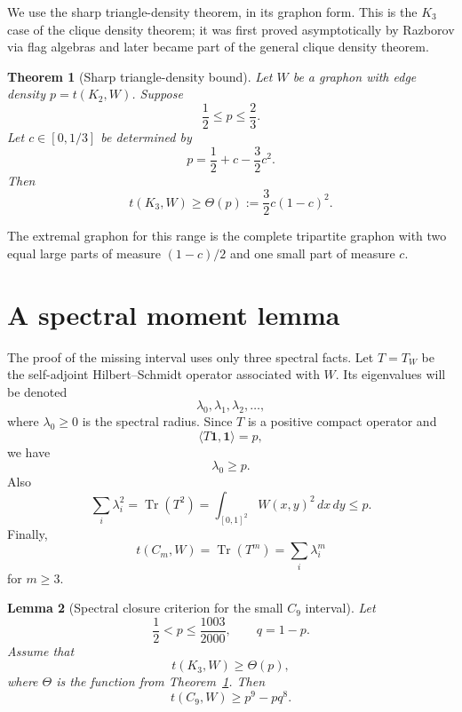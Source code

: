 \documentclass[11pt]{article}
\newtheorem{theorem}{Theorem}[section]
\newtheorem{lemma}[theorem]{Lemma}
\newcommand{\one}{\mathbf 1}
\DeclareMathOperator{\Tr}{Tr}
\begin{document}
We use the sharp triangle-density theorem, in its graphon form.  This is the $K_3$ case of the clique density theorem; it was first proved asymptotically by Razborov via flag algebras and later became part of the general clique density theorem.

\begin{theorem}[Sharp triangle-density bound]\label{thm:triangle-density}
Let $W$ be a graphon with edge density $p=t(K_2,W)$.  Suppose
\[
        \frac12\le p\le\frac23.
\]
Let $c\in[0,1/3]$ be determined by
\[
        p=\frac12+c-\frac32c^2.
\]
Then
\[
        t(K_3,W)\ge \Theta(p):=\frac32 c(1-c)^2.
\]
\end{theorem}

The extremal graphon for this range is the complete tripartite graphon with two equal large parts of measure $(1-c)/2$ and one small part of measure $c$.

\section{A spectral moment lemma}

The proof of the missing interval uses only three spectral facts.  Let $T=T_W$ be the self-adjoint Hilbert--Schmidt operator associated with $W$.  Its eigenvalues will be denoted
\[
        \lambda_0,\lambda_1,\lambda_2,\ldots,
\]
where $\lambda_0\ge0$ is the spectral radius.  Since $T$ is a positive compact operator and
\[
        \langle T\one,\one\rangle=p,
\]
we have
\[
        \lambda_0\ge p.
\]
Also
\[
        \sum_i \lambda_i^2=\Tr(T^2)=\int_{[0,1]^2} W(x,y)^2\,dx\,dy\le p.
\]
Finally,
\[
        t(C_m,W)=\Tr(T^m)=\sum_i\lambda_i^m
\]
for $m\ge3$.

\begin{lemma}[Spectral closure criterion for the small $C_9$ interval]\label{lem:spectral-closure}
Let
\[
        \frac12<p\le\frac{1003}{2000},
        \qquad q=1-p.
\]
Assume that
\[
        t(K_3,W)\ge \Theta(p),
\]
where $\Theta$ is the function from Theorem~\ref{thm:triangle-density}.  Then
\[
        t(C_9,W)\ge p^9-pq^8.
\]
\end{lemma}
\end{document}
